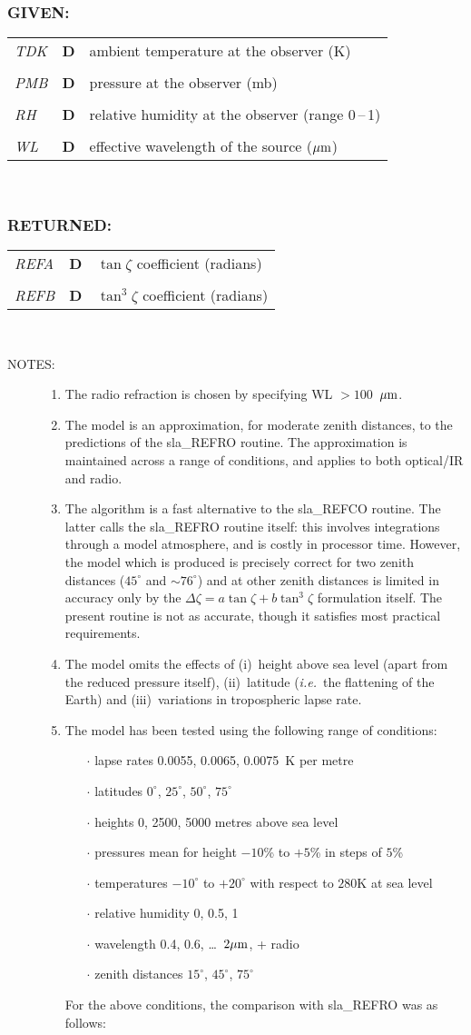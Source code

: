 \documentclass[11pt,twoside,nolof]{starlink}
\newcommand{\args}[2]{
  \subsubsection*{#1:}
     \begin{tabular}{p{7em}p{6em}p{22em}}
       #2
     \end{tabular}\\
}
\newcommand{\spec}[3]
{
  \emph{{#1}} & {\textbf{\mbox{#2}}} & {#3} \\
}
\newcommand{\notes}[1]
 {
   \begin{description}
     \item[NOTES:]
         #1
   \end{description}
}
\begin{document}
\args{GIVEN}
{
 \spec{TDK}{D}{ambient temperature at the observer (K)} \\
 \spec{PMB}{D}{pressure at the observer (mb)} \\
 \spec{RH}{D}{relative humidity at the observer (range 0\,--\,1)} \\
 \spec{WL}{D}{effective wavelength of the source ($\mu{\rm m}$)}
}
\args{RETURNED}
{
 \spec{REFA}{D}{$\tan \zeta$ coefficient (radians)} \\
 \spec{REFB}{D}{$\tan^{3} \zeta$ coefficient (radians)}
}
\notes
{
 \begin{enumerate}
  \item The radio refraction is chosen by specifying WL $>100$~$\mu{\rm m}$.
  \item The model is an approximation, for moderate zenith distances,
        to the predictions of the sla\_REFRO routine.  The approximation
        is maintained across a range of conditions, and applies to
        both optical/IR and radio.
  \item The algorithm is a fast alternative to the sla\_REFCO routine.
        The latter calls the sla\_REFRO routine itself:  this involves
        integrations through a model atmosphere, and is costly in
        processor time.  However, the model which is produced is precisely
        correct for two zenith distances ($45^\circ$ and $\sim\!76^\circ$)
        and at other zenith distances is limited in accuracy only by the
        $\Delta \zeta = a \tan \zeta + b \tan^{3} \zeta$ formulation
        itself.  The present routine is not as accurate, though it
        satisfies most practical requirements.
  \item The model omits the effects of (i)~height above sea level (apart
        from the reduced pressure itself), (ii)~latitude (\textit{i.e.}\ the
        flattening of the Earth) and (iii)~variations in tropospheric
        lapse rate.
  \item The model has been tested using the following range of conditions:
        \begin{itemize}
        \item [$\cdot$] lapse rates 0.0055, 0.0065, 0.0075~K per metre
        \item [$\cdot$] latitudes $0^\circ$, $25^\circ$, $50^\circ$, $75^\circ$
        \item [$\cdot$] heights 0, 2500, 5000 metres above sea level
        \item [$\cdot$] pressures mean for height $-10$\% to $+5$\% in steps of $5$\%
        \item [$\cdot$] temperatures $-10^\circ$ to $+20^\circ$ with respect to
              $280$K at sea level
        \item [$\cdot$] relative humidity 0, 0.5, 1
        \item [$\cdot$] wavelength 0.4, 0.6, \ldots\ $2\mu{\rm m}$, + radio
        \item [$\cdot$] zenith distances $15^\circ$, $45^\circ$, $75^\circ$
        \end{itemize}
        For the above conditions, the comparison with sla\_REFRO
        was as follows:


\end{enumerate}}
\end{document}
